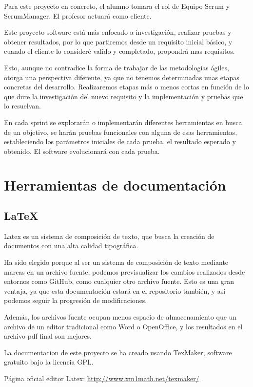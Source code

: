 Para este proyecto en concreto, el alumno tomara el rol de Equipo Scrum y ScrumManager. El profesor actuará como cliente.

Este proyecto software está más enfocado a investigación, realizar pruebas y obtener resultados, por lo que partiremos desde un requisito inicial básico, y cuando el cliente lo consideré valido y completado, propondrá mas requisitos. 

Esto, aunque no contradice la forma de trabajar de las metodologías ágiles, otorga una perspectiva diferente, ya que no tenemos determinadas unas etapas concretas del desarrollo. Realizaremos etapas más o menos cortas en función de lo que dure la investigación del nuevo requisito y la implementación y pruebas que lo resuelvan.

En cada sprint se explorarán o implementarán diferentes herramientas en busca de un objetivo, se harán pruebas funcionales con alguna de esas herramientas, estableciendo los parámetros iniciales de cada prueba, el resultado esperado y obtenido. El software evolucionará con cada prueba.

\section{Herramientas de documentación}

\subsection{LaTeX}

Latex es un sistema de composición de texto, que busca la creación de documentos con una alta calidad tipográfica. 


Ha sido elegido porque al ser un sistema de composición de texto mediante marcas en un archivo fuente, podemos previsualizar los cambios realizados desde entornos como GitHub, como cualquier otro archivo fuente. Esto es una gran ventaja, ya que esta documentación estará en el repositorio también, y así podemos seguir la progresión de modificaciones. 

Además, los archivos fuente ocupan menos espacio de almacenamiento que un archivo de un editor tradicional como Word o OpenOffice, y los resultados en el archivo pdf final son mejores.

La documentacion de este proyecto se ha creado usando TexMaker, software gratuito bajo la licencia GPL.

Página oficial editor Latex: \url{http://www.xm1math.net/texmaker/}

